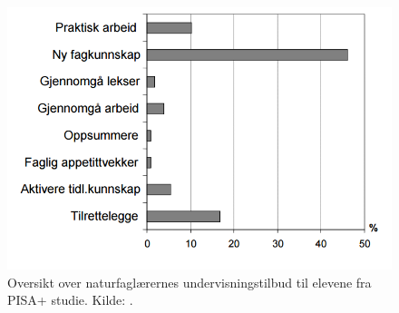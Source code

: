 \documentclass[main.tex]{subfiles}
\begin{document}
\begin{figure}[h!]
\includegraphics[scale = 0.6]{../figures/undervisnings_aktivitet.png}
\caption{Oversikt over naturfaglærernes undervisningstilbud til elevene fra PISA+ studie. Kilde: \protect{}.}
\label{fig:odeg10}
\end{figure}



\end{document}
